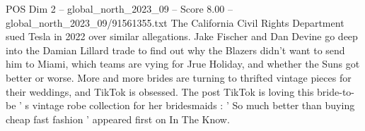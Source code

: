 \begin{textsample}{POS Dim 2 – global\_north\_2023\_09 – Score 8.00 – global\_north\_2023\_09/91561355.txt}
The California Civil Rights Department sued Tesla in 2022 over similar allegations.
Jake Fischer and Dan Devine go deep into the Damian Lillard trade to find out why the Blazers didn't want to send him to Miami, which teams are vying for Jrue Holiday, and whether the Suns got better or worse.
More and more brides are turning to thrifted vintage pieces for their weddings, and TikTok is obsessed.
The post TikTok is loving this bride-to-be ' s vintage robe collection for her bridesmaids : ' So much better than buying cheap fast fashion ' appeared first on In The Know.

\end{textsample}

